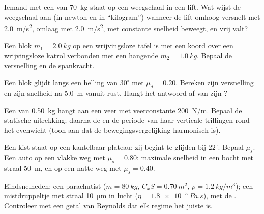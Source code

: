 \begin{exercise}[$\star$]\label{exo:b1:newton-dynamics:1}
Iemand met een  van \qty{70}{kg} staat op een weegschaal in een lift. Wat
wijst de weegschaal aan (in newton en in ``kilogram'') wanneer de lift
omhoog versnelt met \qty{2.0}{m/s^2}, omlaag met \qty{2.0}{m/s^2},
met constante snelheid beweegt, en vrij valt?
\end{exercise}

\begin{exercise}[$\star$]\label{exo:b1:newton-dynamics:2}
Een blok $m_1 = \qty{2.0}{kg}$ op een wrijvingsloze tafel is met een
koord over een wrijvingsloze katrol verbonden met een hangende  $m_2 = \qty{1.0}{kg}$.
Bepaal de versnelling en de spankracht.
\end{exercise}

\begin{exercise}[$\star$]\label{exo:b1:newton-dynamics:3}
Een blok glijdt langs een helling van $30^\circ$ met $\mu_d = 0.20$. Bereken
zijn versnelling en zijn snelheid na \qty{5.0}{m} vanuit rust. Hangt het
antwoord af van zijn ?
\end{exercise}

\begin{exercise}[$\star$]\label{exo:b1:newton-dynamics:4}
Een  van \qty{0.50}{kg} hangt aan een veer met veerconstante \qty{200}{N/m}.
Bepaal de statische uitrekking; daarna de  en de periode van
haar verticale trillingen rond het evenwicht (toon aan dat de bewegingsvergelijking
harmonisch is).
\end{exercise}

\begin{exercise}[$\star\star$]\label{exo:b1:newton-dynamics:5}
Een kist staat op een kantelbaar plateau; zij begint te glijden bij $22^\circ$.
Bepaal $\mu_s$. Een auto op een vlakke weg met $\mu_s = 0.80$: maximale snelheid
in een bocht met straal \qty{50}{m}, en op een natte weg met $\mu_s = 0.40$.
\end{exercise}

\begin{exercise}[$\star\star$]\label{exo:b1:newton-dynamics:6}
Eindsnelheden: een parachutist ($m = \qty{80}{kg}$, $C_xS = \qty{0.70}{m^2}$,
$\rho = \qty{1.2}{kg/m^3}$); een mistdruppeltje met straal \qty{10}{\micro m}
in lucht ($\eta = \qty{1.8e-5}{Pa.s}$), met de . Controleer met een
getal van Reynolds dat elk regime het juiste is.
\end{exercise}

